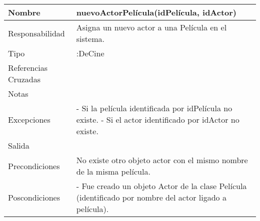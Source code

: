 \documentclass{article}
\begin{document}
\begin{table}[h]
\begin{tabular}{|l|l|l|l|l|l|}
\hline
\multicolumn{2}{|p{3cm}|}{Nombre} & \multicolumn{3}{p{8cm}|}{\textbf{nuevoActorPelícula(idPelícula, idActor)}}\\
\hline
\multicolumn{2}{|p{3cm}|}{Responsabilidad} & \multicolumn{4}{p{8cm}|}{Asigna un nuevo actor a una Película en el sistema.} \\
\hline
\multicolumn{2}{|p{3cm}|}{Tipo} & \multicolumn{4}{p{8cm}|}{:DeCine} \\
\hline
\multicolumn{2}{|p{3cm}|}{Referencias Cruzadas} & \multicolumn{4}{p{8cm}|}{} \\
\hline
\multicolumn{2}{|p{3cm}|}{Notas} & \multicolumn{4}{p{8cm}|}{} \\
\hline
\multicolumn{2}{|p{3cm}|}{Excepciones} & \multicolumn{4}{p{8cm}|}{-	Si la película identificada por idPelícula no existe.
-	Si el actor identificado por idActor no existe.
} \\
\hline
\multicolumn{2}{|p{3cm}|}{Salida} & \multicolumn{4}{p{8cm}|}{} \\
\hline
\multicolumn{2}{|p{3cm}|}{Precondiciones} & \multicolumn{4}{p{8cm}|}{No existe otro objeto actor con el mismo nombre de la misma película.} \\
\hline
\multicolumn{2}{|p{3cm}|}{Poscondiciones} & \multicolumn{4}{p{8cm}|}{- Fue creado un objeto Actor de la clase Película (identificado por nombre del actor ligado a película).} \\
\hline
\end{tabular}
\end{table}
\end{document}
